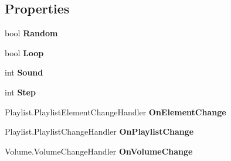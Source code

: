 \subsection*{Properties}
\begin{DoxyCompactItemize}
\item 
\hypertarget{class_media_motion_1_1_modules_1_1_media_player_1_1_a_media_player_a29ac1f7c962118ba34d461799f00eeda}{bool {\bfseries Random}}\label{class_media_motion_1_1_modules_1_1_media_player_1_1_a_media_player_a29ac1f7c962118ba34d461799f00eeda}

\item 
\hypertarget{class_media_motion_1_1_modules_1_1_media_player_1_1_a_media_player_a28fb72902ee85e50daa7f303b46853e2}{bool {\bfseries Loop}}\label{class_media_motion_1_1_modules_1_1_media_player_1_1_a_media_player_a28fb72902ee85e50daa7f303b46853e2}

\item 
\hypertarget{class_media_motion_1_1_modules_1_1_media_player_1_1_a_media_player_a79267fda4e4d4507cb22afa0df1d5eef}{int {\bfseries Sound}}\label{class_media_motion_1_1_modules_1_1_media_player_1_1_a_media_player_a79267fda4e4d4507cb22afa0df1d5eef}

\item 
\hypertarget{class_media_motion_1_1_modules_1_1_media_player_1_1_a_media_player_ae7ee002fc13e1564ec66fec4b941caf6}{int {\bfseries Step}}\label{class_media_motion_1_1_modules_1_1_media_player_1_1_a_media_player_ae7ee002fc13e1564ec66fec4b941caf6}

\item 
\hypertarget{class_media_motion_1_1_modules_1_1_media_player_1_1_a_media_player_a607976f0c627f55c3d37662c61b669ee}{Playlist.\+Playlist\+Element\+Change\+Handler {\bfseries On\+Element\+Change}}\label{class_media_motion_1_1_modules_1_1_media_player_1_1_a_media_player_a607976f0c627f55c3d37662c61b669ee}

\item 
\hypertarget{class_media_motion_1_1_modules_1_1_media_player_1_1_a_media_player_a65d514d22afc077898c88e0e3c7c6913}{Playlist.\+Playlist\+Change\+Handler {\bfseries On\+Playlist\+Change}}\label{class_media_motion_1_1_modules_1_1_media_player_1_1_a_media_player_a65d514d22afc077898c88e0e3c7c6913}

\item 
\hypertarget{class_media_motion_1_1_modules_1_1_media_player_1_1_a_media_player_a1f77dbd1006da4cd3356de2cfdcc674e}{Volume.\+Volume\+Change\+Handler {\bfseries On\+Volume\+Change}}\label{class_media_motion_1_1_modules_1_1_media_player_1_1_a_media_player_a1f77dbd1006da4cd3356de2cfdcc674e}

\end{DoxyCompactItemize}
